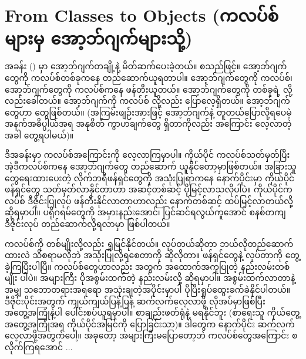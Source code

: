 \chapter{ From Classes to Objects (ကလပ်စ်များမှ အော့ဘ်ဂျက်များသို့)}

အခန်း (\fRefNo{\ref{ch:ch06objs}}) မှာ အော့ဘ်ဂျက်တချို့နဲ့ မိတ်ဆက်ပေးခဲ့တယ်။ \fEn{,} \fEn{,}  စသည်ဖြင့်။ အော့ဘ်ဂျက်တွေကို ကလပ်စ်တစ်ခုကနေ တည်ဆောက်ယူရတာပါ။  အော့ဘ်ဂျက်တွေကို  ကလပ်စ်၊  အော့ဘ်ဂျက်တွေကို  ကလပ်စ်ကနေ ဖန်တီးယူတယ်။  အော့ဘ်ဂျက်တွေကို  တစ်ခုရဲ့  လို့လည်းခေါ်တယ်။  အော့ဘ်ဂျက်ကို  ကလပ်စ်  လို့လည်း ပြောလေ့ရှိတယ်။ အော့ဘ်ဂျက်တွေဟာ  တွေဖြစ်တယ်။ (အကြမ်းဖျဉ်းအားဖြင့် အော့ဘ်ဂျက်နဲ့   တူတယ်ပြောလို့ရပေမဲ့ အနက်အဓိပ္ပါယ်အရ အနုစိတ် ကွာဟချက်တွေ ရှိတာကိုလည်း  အကြောင်း လေ့လာတဲ့အခါ တွေ့ရပါမယ်)။

ဒီအခန်းမှာ ကလပ်စ်အကြောင်းကို လေ့လာကြမှာပါ။ ကိုယ်ပိုင် ကလပ်စ်သတ်မှတ်ပြီး အဲ့ဒီကလပ်စ်ကနေ အော့ဘ်ဂျက်တွေ တည်ဆောက် ယူနိုင်တော့မှာဖြစ်တယ်။ အခြားသူတွေရေးထားပေးတဲ့ လိုက်ဘရီဖန်ရှင်တွေကို အသုံးပြုရာကနေ နောက်ပိုင်းမှာ ကိုယ်ပိုင် ဖန်ရှင်တွေ သတ်မှတ်လာနိုင်တာဟာ အဆင့်တစ်ဆင့် ပိုမြင့်လာသလိုပါပဲ။ ကိုယ်ပိုင်ကလပ်စ် ဒီဇိုင်းပြုလုပ် ဖန်တီးနိုင်လာတာဟာလည်း နောက်တစ်ဆင့် ထပ်မြင့်လာတယ်လို့ ဆိုရမှာပါ။ ပရိုဂရမ်တွေကို အမှားနည်းအောင်၊ ပြင်ဆင်ရလွယ်ကူအောင် စနစ်တကျ ဒီဇိုင်းလုပ် တည်ဆောက်လို့ရလာမှာ ဖြစ်ပါတယ်။

ကလပ်စ်ကို  တစ်မျိုးလို့လည်း ရှုမြင်နိုင်တယ်။  လုပ်တယ်ဆိုတာ ဘယ်လိုတည်ဆောက်ထားလဲ သိစရာမလိုဘဲ အသုံးပြုလို့ရစေတာကို ဆိုလိုတာ။ ဖန်ရှင်တွေနဲ့  လုပ်တာကို တွေ့ခဲ့ကြပြီးပါပြီ။ ကလပ်စ်တွေဟာလည်း  အတွက် အထောက်\allowbreak အကူပြုတဲ့ နည်းလမ်းတစ်မျိုး  ပါပဲ။ အများကြီး ပိုအစွမ်းထက်တဲ့ နည်းလမ်းလို့ ဆိုရမှာပါ။ အစွမ်းထက်လာတာနဲ့အမျှ သဘောတရားအရရော အသုံးချတဲ့အပိုင်းမှာပါ ပိုပြီးရှုပ်ထွေးခက်ခဲနိုင်ပါတယ်။ ဒီဇိုင်းပိုင်းအတွက် ကျယ်ကျယ်ပြန့်ပြန့် ဆက်လက်လေ့လာဖို့ လိုအပ်မှာဖြစ်ပြီး အတွေ့အကြုံနဲ့ပါ ပေါင်းစပ်ယူရမှာပါ။ စာချည်းဖတ်ရုံနဲ့ မရနိုင်ဘူး (စာရေးသူ ကိုယ်တွေ့ အတွေ့အကြုံအရ ကိုယ်ပိုင်အမြင်ကို ပြောခြင်းသာ)။  ဒါတွေက နောက်ပိုင်း ဆက်လက်လေ့လာဖို့အတွက်ပေါ့။ အခုတော့ အများကြီးမပြောတော့ဘဲ ကလပ်စ်တွေအကြောင်း စလိုက်ကြရအောင် $\ldots$


